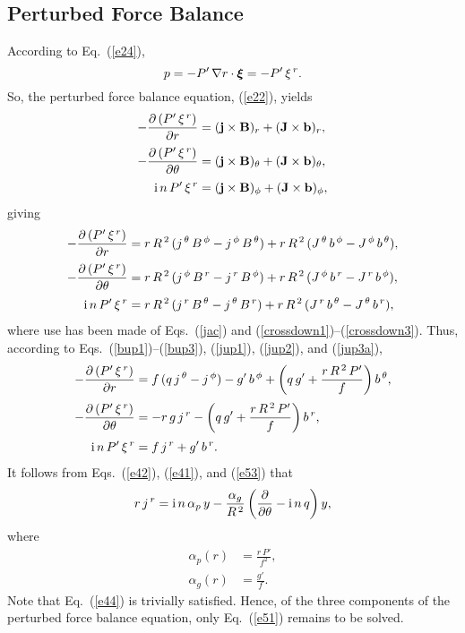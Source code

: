\documentclass[12pt,prb,aps]{revtex4-1}
\newcommand {\bxi}{\mbox{\boldmath$\xi$}}
\begin{document}
\subsection{Perturbed Force Balance}
According to Eq.~(\ref{e24}), 
\begin{equation}
p =-P'\,\nabla r\cdot\bxi=- P'\,\xi^{\,r}.
\end{equation}
So, the perturbed force balance equation, (\ref{e22}), yields
\begin{align}
-\frac{\partial\, (P'\,\xi^{\,r})}{\partial r} &= ({\bf j}\times {\bf B})_r+({\bf J}\times {\bf b})_r,\\[0.5ex]
-\frac{\partial\,(P'\,\xi^{\,r})}{\partial \theta}&= ({\bf j}\times {\bf B})_\theta+({\bf J}\times {\bf b})_\theta,\\[0.5ex]
{\rm i}\,n\,P'\,\xi^{\,r} &= ({\bf j}\times {\bf B})_\phi+({\bf J}\times {\bf b})_\phi,
\end{align}
giving
\begin{align}
-\frac{\partial\, (P'\,\xi^{\,r})}{\partial r} &=r\,R^{\,2}\,(j^{\,\theta}\,B^{\,\phi}-j^{\,\phi}\,B^{\,\theta}) + r\,R^{\,2}\,(J^{\,\theta}\,b^{\,\phi}-J^{\,\phi}\,b^{\,\theta}),\\[0.5ex]
-\frac{\partial\,(P'\,\xi^{\,r})}{\partial \theta}&=r\,R^{\,2}\,(j^{\,\phi}\,B^{\,r}-j^{\,r}\,B^{\,\phi}) + r\,R^{\,2}\,(J^{\,\phi}\,b^{\,r}-J^{\,r}\,b^{\,\phi}),\\[0.5ex]
{\rm i}\,n\,P'\,\xi^{\,r} &=r\,R^{\,2}\,(j^{\,r}\,B^{\,\theta}-j^{\,\theta}\,B^{\,r}) + r\,R^{\,2}\,(J^{\,r}\,b^{\,\theta}-J^{\,\theta}\,b^{\,r}),
\end{align}
where use has been made of Eqs.~(\ref{jac}) and (\ref{crossdown1})--(\ref{crossdown3}). 
Thus, according to Eqs.~(\ref{bup1})--(\ref{bup3}), (\ref{jup1}), (\ref{jup2}), and (\ref{jup3a}), 
\begin{align}
-\frac{\partial\, (P'\,\xi^{\,r})}{\partial r} &= f\,(q\,j^{\,\theta} -j^{\,\phi}) - g'\,b^{\,\phi} + \left(q\,g'+\frac{r\,R^{\,2}\,P'}{f}\right)b^{\,\theta},\label{e51}\\[0.5ex]
-\frac{\partial\,(P'\,\xi^{\,r})}{\partial \theta}&=-r\,g\,j^{\,r} - \left(q\,g'+\frac{r\,R^{\,2}\,P'}{f}\right)b^{\,r},\label{e44}\\[0.5ex]
{\rm i}\,n\,P'\,\xi^{\,r} &= f\,j^{\,r}+g'\,b^{\,r}.\label{e53}
\end{align}
It follows from Eqs.~(\ref{e42}), (\ref{e41}), and (\ref{e53}) that 
\begin{equation}\label{e54}
r\,j^{\,r} = {\rm i}\,n\,\alpha_p\,y - \frac{\alpha_g}{R^{\,2}}\left(\frac{\partial}{\partial\theta}-{\rm i}\,n\,q\right)y,
\end{equation}
where
\begin{align}
\alpha_p(r) &= \frac{r\,P'}{f^2},\label{ap}\\[0.5ex]
\alpha_g (r)&= \frac{g'}{f}.\label{ag}
\end{align}
Note that Eq.~(\ref{e44}) is trivially satisfied. Hence, of the three components of the perturbed force balance equation, only Eq.~(\ref{e51}) remains to be solved. 
\end{document}

